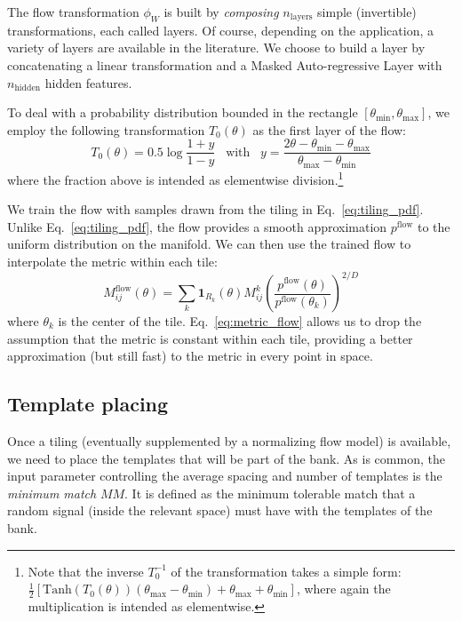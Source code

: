 \documentclass[twocolumn,showpacs,preprintnumbers,nofootinbib,prd,
superscriptaddress,10pt]{revtex4-2}
\begin{document}
The flow transformation $\phi_W$ is built by {\it composing} $n_\text{layers}$ simple (invertible) transformations, each called layers. Of course, depending on the application, a variety of layers are available in the literature. We choose to build a layer by concatenating a linear transformation and a Masked Auto-regressive Layer \cite{MADE, MAF,MAF_bis} with $n_\text{hidden}$ hidden features.

To deal with a probability distribution bounded in the rectangle $[\theta_\text{min}, \theta_\text{max}]$, we employ the following transformation $T_0(\theta)$ as the first layer of the flow:
\begin{equation}
	T_0(\theta) = 0.5 \log \frac{1 + y}{1 - y} \;\;\; \text{with} \;\;\; y = \frac{2\theta - \theta_\text{min} - \theta_\text{max}}{\theta_\text{max}- \theta_\text{min}}
\end{equation}
where the fraction above is intended as elementwise division.\footnote{
Note that the inverse $T_0^{-1}$ of the transformation takes a simple form: $\frac{1}{2} [\text{Tanh}(T_0(\theta))(\theta_\text{max} - \theta_\text{min})+\theta_\text{max}+ \theta_\text{min}]$, where again the multiplication is intended as elementwise.
}

We train the flow with samples drawn from the tiling in Eq.~\eqref{eq:tiling_pdf}.
Unlike Eq.~\eqref{eq:tiling_pdf}, the flow provides a smooth approximation  $p^\text{flow}$ to the uniform distribution on the manifold.
We can then use the trained flow to interpolate the metric within each tile:
\begin{equation}\label{eq:metric_flow}
	M^{\text{flow}}_{ij}(\theta) = \sum_{k} \mathbf{1}_{R_k}(\theta) M^{k}_{ij} \left( \frac{p^{\text{flow}}(\theta)}{p^{\text{flow}}(\theta_k)}\right)^{2/D}
\end{equation}
where $\theta_k$ is the center of the tile.
Eq.~\eqref{eq:metric_flow} allows us to drop the assumption that the metric is constant within each tile, providing a better approximation (but still fast) to the metric in every point in space.

\subsection{Template placing} \label{sec:template_placing}

Once a tiling (eventually supplemented by a normalizing flow model) is available, we need to place the templates that will be part of the bank.
As is common, the input parameter controlling the average spacing and number of templates is the {\it minimum match} $MM$. It is defined as the minimum tolerable match that a random signal (inside the relevant space) must have with the templates of the bank.
\end{document}
